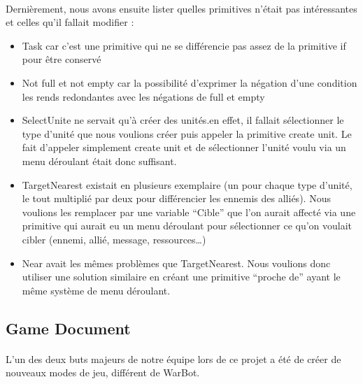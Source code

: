 \documentclass{report}
\begin{document}
\paragraph{}

  Dernièrement, nous avons ensuite lister quelles primitives n’était pas intéressantes et celles qu’il fallait modifier :
\begin{itemize}
\item Task car c’est une primitive qui ne se différencie pas assez de la primitive if pour être conservé
\item Not full et not empty car la possibilité d’exprimer la négation d’une condition les rends redondantes avec les négations de full et empty
\item SelectUnite ne servait qu’à créer des unités.en effet, il fallait sélectionner le type d’unité que nous voulions créer puis appeler la primitive create unit. Le fait d’appeler simplement create unit et de sélectionner l’unité voulu via un menu déroulant était donc suffisant.
\item TargetNearest existait en plusieurs exemplaire (un pour chaque type d’unité, le tout multiplié par deux pour différencier les ennemis des alliés). Nous voulions les remplacer par une variable “Cible” que l’on aurait affecté via une primitive qui aurait eu un menu déroulant pour sélectionner ce qu’on voulait cibler (ennemi, allié, message, ressources…)
\item Near avait les mêmes problèmes que TargetNearest. Nous voulions donc utiliser une solution similaire en créant une primitive “proche de” ayant le même système de menu déroulant.
\end{itemize}
\subsection{Game Document}
\paragraph{}
  L’un des deux buts majeurs de notre équipe lors de ce projet a été de créer de nouveaux modes de jeu, différent de WarBot.
\end{document}
